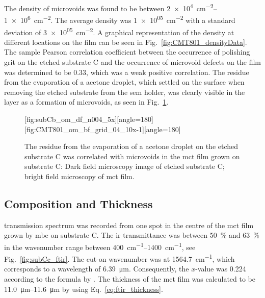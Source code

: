 The density of microvoids was found to be between \SIrange{2e+4}{1e+6}{\centi\metre^{-2}}. The average density was \SI{1e+05}{\centi\metre^{-2}} with a standard deviation of \SI{3e+05}{\centi\metre^{-2}}. A graphical representation of the density at different locations on the film can be seen in Fig.~\ref{fig:CMT801_densityData}. The sample Pearson correlation coefficient between the occurrence of polishing grit on the etched substrate C and the occurrence of microvoid defects on the film was determined to be \SI{0.33}{}, which was a weak positive correlation. The residue from the evaporation of a acetone droplet, which settled on the surface when removing the etched substrate from the \ac{sem} holder, was clearly visible in the layer as a formation of microvoids, as seen in Fig.~\ref{fig:subCc_microvoids_correlation}.

\begin{figure}[htbp]
    \centering
    [fig:subCb_om_df_n004_5x][angle=180]
    \hfill
    [fig:CMT801_om_bf_grid_04_10x-1][angle=180]
    \caption[Residue on etched substrate C visible as microvoids in the film.]{The residue from the evaporation of a acetone droplet on the etched substrate C was correlated with microvoids in the \ac{mct} film grown on substrate C:  Dark field microscopy image of etched substrate C;  bright field microscopy of \ac{mct} film.}\label{fig:subCc_microvoids_correlation}
\end{figure}


\subsection{Composition and Thickness}

 transmission spectrum was recorded from one spot in the centre of the \ac{mct} film grown by \ac{mbe} on substrate C. The \ac{ir} transmittance was between \SI{50}{\percent} and \SI{63}{\percent} in the wavenumber range between \SIrange{400}{1400}{\centi\metre^{-1}}, see Fig.~\ref{fig:subCc_ftir}. The cut-on wavenumber was at \SI{1564.7}{\centi\metre^{-1}}, which corresponds to a wavelength of \SI{6.39}{\micro\metre}. Consequently, the $x$-value was \SI{0.224}{} according to the formula by \citet{bricexxxxtttt}. The thickness of the \ac{mct} film was calculated to be \SIrange{11.0}{11.6}{\micro\metre} by using Eq.~\ref{eq:ftir_thickness}.

